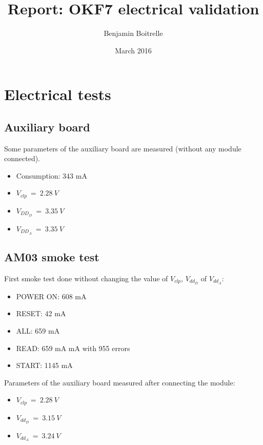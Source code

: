 \documentclass[a4papper, 10pt]{article}
\title{Report: OKF7 electrical validation}
\author{Benjamin Boitrelle}
\date{March 2016}
\begin{document}
    \maketitle
    

  \section{Electrical tests}
    \subsection{Auxiliary board}
    
   Some parameters of the auxiliary board are measured (without any module connected).
   \begin{itemize}
     \item Consumption: 343 mA
     \item $V_{clp} \ = \ 2.28 \ V$
     \item $V_{DD_D} \ = \ 3.35 \ V$
     \item $V_{DD_A} \ = \ 3.35 \ V$
   \end{itemize}

     \subsection{AM03 smoke test}

    First smoke test done without changing the value of  $V_{clp}$, $V_{dd_D}$ of $V_{dd_A}$:
     \begin{itemize}
       \item POWER ON: 608 mA
       \item RESET: 42 mA
       \item ALL: 659 mA
       \item READ: 659 mA mA with 955 errors 
       \item START: 1145 mA 
     \end{itemize}

     Parameters of the auxiliary board measured after connecting the module:

     \begin{itemize}
       \item $V_{clp} \ = \ 2.28 \ V$ 
       \item $V_{dd_D} \ = \ 3.15 \ V$
       \item $V_{dd_A} \ = \ 3.24 \ V$
     \end{itemize}
\end{document}
